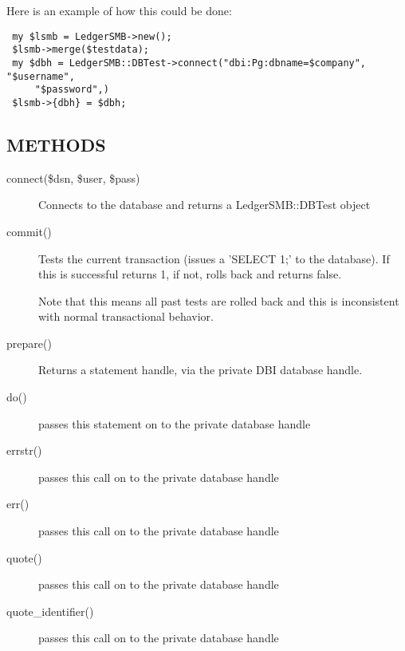\begin{description}
\begin{description}
\begin{description}
\begin{description}
\begin{description}
Here is an example of how this could be done:

\begin{verbatim}
 my $lsmb = LedgerSMB->new();
 $lsmb->merge($testdata);
 my $dbh = LedgerSMB::DBTest->connect("dbi:Pg:dbname=$company", "$username",
     "$password",)
 $lsmb->{dbh} = $dbh;
\end{verbatim}
\subsection*{METHODS\label{LedgerSMB::DBTest_METHODS}}
\begin{description}

\item[{connect(\$dsn, \$user, \$pass)}] \mbox{}

Connects to the database and returns a LedgerSMB::DBTest object


\item[{commit()}] \mbox{}

Tests the current transaction (issues a 'SELECT 1;' to the database).  If this
is successful returns 1, if not, rolls back and returns false.



Note that this means all past tests are rolled back and this is inconsistent
with normal transactional behavior.


\item[{prepare()}] \mbox{}

Returns a statement handle, via the private DBI database handle.


\item[{do()}] \mbox{}

passes this statement on to the private database handle


\item[{errstr()}] \mbox{}

passes this call on to the private database handle


\item[{err()}] \mbox{}

passes this call on to the private database handle


\item[{quote()}] \mbox{}

passes this call on to the private database handle


\item[{quote\_identifier()}] \mbox{}

passes this call on to the private database handle



\end{description}
\end{description}
\end{description}
\end{description}
\end{description}
\end{description}
